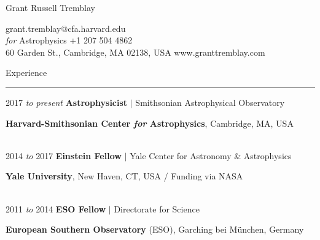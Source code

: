 \documentclass[11pt]{article}
\makeatletter
\def\vhrulefill#1{\leavevmode\leaders\hrule\@height#1\hfill \kern\z@}
\makeatother
\begin{document}
\thispagestyle{empty}

\begin{center}
\hspace*{0.5in}
{\Large {\sc Grant Russell Tremblay}}\\
\end{center}
{\small
\hspace*{6mm}{\sc Astrophysicist} \hfill grant.tremblay@cfa.harvard.edu\\
\hspace*{6mm}{\sc Harvard-Smithsonian Center} {\it for} {\sc Astrophysics} \hfill +1 207 504 4862 \\ 
\hspace*{6mm}60 Garden St., Cambridge, MA 02138, USA \hfill www.granttremblay.com\\}



{\sc Experience} \vhrulefill{0.4pt}


\vspace{2mm}


\hspace{2.5mm} 2017 {\it to present} \hspace{13.5mm} \textbf{Astrophysicist} $|$ Smithsonian Astrophysical Observatory

\hspace{42mm} \parbox{5.15in}{ \textbf{Harvard-Smithsonian Center \textit{for} Astrophysics}, Cambridge, MA, USA}\\


\hspace{2.5mm} 2014 {\it to} 2017 \hspace{17mm} \textbf{Einstein Fellow}
$|$ Yale Center for Astronomy \& Astrophysics

\hspace{42mm} \parbox{5.15in}{{\bf Yale University}, New Haven, CT, USA / Funding via NASA}\\



\hspace{2.5mm} 2011 {\it to} 2014 \hspace{17mm} \textbf{ESO Fellow} $|$ Directorate for Science

\hspace{42mm} \parbox{5.15in}{{\bf European Southern Observatory} (ESO), Garching bei M\"{u}nchen, Germany}\\
\end{document}
